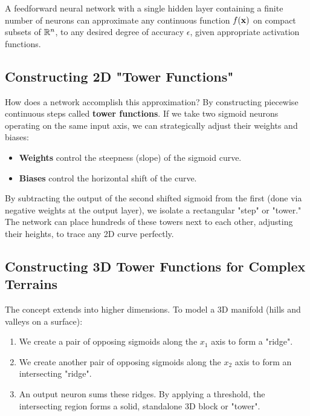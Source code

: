 \begin{theorembox}
A feedforward neural network with a single hidden layer containing a finite number of neurons can approximate any continuous function $f(\mathbf{x})$ on compact subsets of $\mathbb{R}^n$, to any desired degree of accuracy $\epsilon$, given appropriate activation functions.
\end{theorembox}

\subsection{Constructing 2D "Tower Functions"}

How does a network accomplish this approximation? By constructing piecewise continuous steps called \textbf{tower functions}.
If we take two sigmoid neurons operating on the same input axis, we can strategically adjust their weights and biases:
\begin{itemize}
    \item \textbf{Weights} control the steepness (slope) of the sigmoid curve.
    \item \textbf{Biases} control the horizontal shift of the curve.
\end{itemize}
By subtracting the output of the second shifted sigmoid from the first (done via negative weights at the output layer), we isolate a rectangular "step" or "tower." The network can place hundreds of these towers next to each other, adjusting their heights, to trace any 2D curve perfectly.

\subsection{Constructing 3D Tower Functions for Complex Terrains}

The concept extends into higher dimensions. To model a 3D manifold (hills and valleys on a surface):
\begin{enumerate}
    \item We create a pair of opposing sigmoids along the $x_1$ axis to form a "ridge".
    \item We create another pair of opposing sigmoids along the $x_2$ axis to form an intersecting "ridge".
    \item An output neuron sums these ridges. By applying a threshold, the intersecting region forms a solid, standalone 3D block or "tower".
\end{enumerate}

